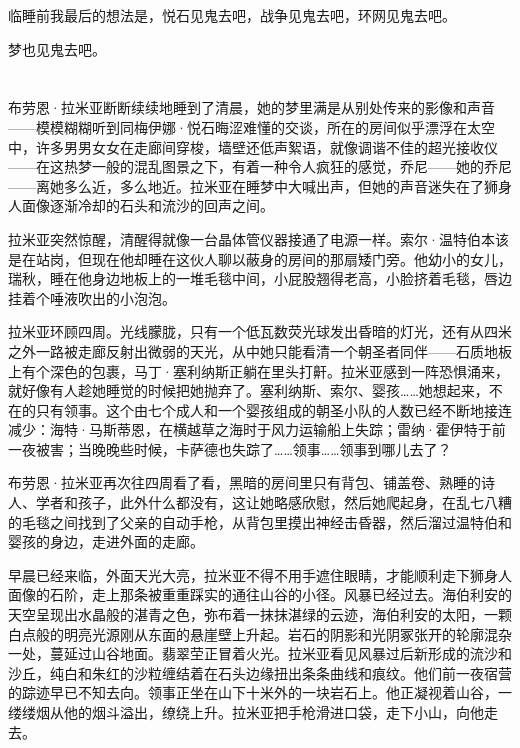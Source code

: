 \documentclass[AutoFakeBold=true]{book}
\begin{document}
临睡前我最后的想法是，{\kaishu 悦石见鬼去吧，战争见鬼去吧，环网见鬼去吧。}

{\kaishu 梦也见鬼去吧。}

\part{}

\chapter{}

布劳恩·拉米亚断断续续地睡到了清晨，她的梦里满是从别处传来的影像和声音——模模糊糊听到同梅伊娜·悦石晦涩难懂的交谈，所在的房间似乎漂浮在太空中，许多男男女女在走廊间穿梭，墙壁还低声絮语，就像调谐不佳的超光接收仪——在这热梦一般的混乱图景之下，有着一种令人疯狂的感觉，乔尼——她的乔尼——离她多么近，{\kaishu 多么地近}。拉米亚在睡梦中大喊出声，但她的声音迷失在了狮身人面像逐渐冷却的石头和流沙的回声之间。

拉米亚突然惊醒，清醒得就像一台晶体管仪器接通了电源一样。索尔·温特伯本该是在站岗，但现在他却睡在这伙人聊以蔽身的房间的那扇矮门旁。他幼小的女儿，瑞秋，睡在他身边地板上的一堆毛毯中间，小屁股翘得老高，小脸挤着毛毯，唇边挂着个唾液吹出的小泡泡。

拉米亚环顾四周。光线朦胧，只有一个低瓦数荧光球发出昏暗的灯光，还有从四米之外一路被走廊反射出微弱的天光，从中她只能看清一个朝圣者同伴——石质地板上有个深色的包裹，马丁·塞利纳斯正躺在里头打鼾。拉米亚感到一阵恐惧涌来，就好像有人趁她睡觉的时候把她抛弃了。塞利纳斯、索尔、婴孩……她想起来，不在的只有领事。这个由七个成人和一个婴孩组成的朝圣小队的人数已经不断地接连减少：海特·马斯蒂恩，在横越草之海时于风力运输船上失踪；雷纳·霍伊特于前一夜被害；当晚晚些时候，卡萨德也失踪了……领事……领事到哪儿去了？

布劳恩·拉米亚再次往四周看了看，黑暗的房间里只有背包、铺盖卷、熟睡的诗人、学者和孩子，此外什么都没有，这让她略感欣慰，然后她爬起身，在乱七八糟的毛毯之间找到了父亲的自动手枪，从背包里摸出神经击昏器，然后溜过温特伯和婴孩的身边，走进外面的走廊。

早晨已经来临，外面天光大亮，拉米亚不得不用手遮住眼睛，才能顺利走下狮身人面像的石阶，走上那条被重重踩实的通往山谷的小径。风暴已经过去。海伯利安的天空呈现出水晶般的湛青之色，弥布着一抹抹湛绿的云迹，海伯利安的太阳，一颗白点般的明亮光源刚从东面的悬崖壁上升起。岩石的阴影和光阴冢张开的轮廓混杂一处，蔓延过山谷地面。翡翠茔正冒着火光。拉米亚看见风暴过后新形成的流沙和沙丘，纯白和朱红的沙粒缠结着在石头边缘扭出条条曲线和痕纹。他们前一夜宿营的踪迹早已不知去向。领事正坐在山下十米外的一块岩石上。他正凝视着山谷，一缕缕烟从他的烟斗溢出，缭绕上升。拉米亚把手枪滑进口袋，走下小山，向他走去。
\end{document}
